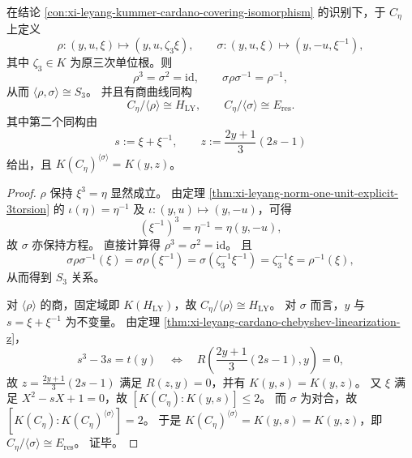\begin{conclusion}[显式 \(S_3\) 作用与商曲线识别]\label{con:xi-leyang-explicit-s3-action-and-quotients}
在结论 \ref{con:xi-leyang-kummer-cardano-covering-isomorphism} 的识别下，于 \(C_\eta\) 上定义
\[
\rho:(y,u,\xi)\longmapsto (y,u,\zeta_3\xi),
\qquad
\sigma:(y,u,\xi)\longmapsto (y,-u,\xi^{-1}),
\]
其中 \(\zeta_3\in K\) 为原三次单位根。则
\[
\rho^3=\sigma^2=\mathrm{id},
\qquad
\sigma\rho\sigma^{-1}=\rho^{-1},
\]
从而 \(\langle\rho,\sigma\rangle\cong S_3\)。
并且有商曲线同构
\[
C_\eta/\langle\rho\rangle\cong H_{\mathrm{LY}},
\qquad
C_\eta/\langle\sigma\rangle\cong E_{\mathrm{res}}.
\]
其中第二个同构由
\[
s:=\xi+\xi^{-1},
\qquad
z:=\frac{2y+1}{3}(2s-1)
\]
给出，且 \(K(C_\eta)^{\langle\sigma\rangle}=K(y,z)\)。
\end{conclusion}
\begin{proof}
\(\rho\) 保持 \(\xi^3=\eta\) 显然成立。
由定理 \ref{thm:xi-leyang-norm-one-unit-explicit-3torsion} 的
\(
\iota(\eta)=\eta^{-1}
\)
及 \(\iota:(y,u)\mapsto(y,-u)\)，可得
\[
(\xi^{-1})^3=\eta^{-1}=\eta(y,-u),
\]
故 \(\sigma\) 亦保持方程。
直接计算得 \(\rho^3=\sigma^2=\mathrm{id}\)。
且
\[
\sigma\rho\sigma^{-1}(\xi)
=\sigma\rho(\xi^{-1})
=\sigma(\zeta_3^{-1}\xi^{-1})
=\zeta_3^{-1}\xi
=\rho^{-1}(\xi),
\]
从而得到 \(S_3\) 关系。

对 \(\langle\rho\rangle\) 的商，固定域即 \(K(H_{\mathrm{LY}})\)，故
\(
C_\eta/\langle\rho\rangle\cong H_{\mathrm{LY}}
\)。
对 \(\sigma\) 而言，\(y\) 与 \(s=\xi+\xi^{-1}\) 为不变量。
由定理 \ref{thm:xi-leyang-cardano-chebyshev-linearization-z}，
\[
s^3-3s=t(y)
\quad\Longleftrightarrow\quad
R\!\left(\frac{2y+1}{3}(2s-1),y\right)=0,
\]
故 \(z=\frac{2y+1}{3}(2s-1)\) 满足 \(R(z,y)=0\)，并有 \(K(y,s)=K(y,z)\)。
又 \(\xi\) 满足 \(X^2-sX+1=0\)，故
\(
[K(C_\eta):K(y,s)]\le 2
\)。
而 \(\sigma\) 为对合，故
\(
[K(C_\eta):K(C_\eta)^{\langle\sigma\rangle}]=2
\)。
于是 \(K(C_\eta)^{\langle\sigma\rangle}=K(y,s)=K(y,z)\)，即
\(
C_\eta/\langle\sigma\rangle\cong E_{\mathrm{res}}
\)。
证毕。
\end{proof}

